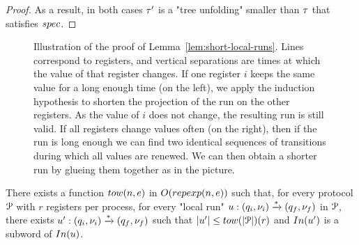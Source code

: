 \begin{proof}
	As a result, in both cases $\tau'$ is a "tree unfolding" smaller than $\tau$ that satisfies $\spec$. 
\end{proof}
\fi

\begin{figure}
	
	\caption{Illustration of the proof of Lemma~\ref{lem:short-local-runs}. Lines correspond to registers, and vertical separations are times at which the value of that register changes. If one register $i$ keeps the same value for a long enough time (on the left), we apply the induction hypothesis to shorten the projection of the run on the other registers. As the value of $i$ does not change, the resulting run is still valid. If all registers change values often (on the right), then if the run is long enough we can find two identical sequences of transitions during which all values are renewed. We can then obtain a shorter run by glueing them together as in the picture.}
\end{figure}




\begin{lemma}
	\label{lem:short-local-runs}
	There exists a function $\towerfun(n, e)$ in $O(\repexp{n}{e})$ such that, for every protocol $\mathcal{P}$ with $r$ registers per process, for every "local run" $u: (q_i, \nu_i) \xrightarrow{*} (q_f, \nu_f)$ in $\mathcal{P}$, there exists $u': (q_i, \nu_i) \xrightarrow{*} (q_f, \nu_f)$ such that $\length{\localrun'} \leq \towerfun(\size{\prot})(r)$ and $\Input{\localrun'}$ is a subword of $\Input{\localrun}$. 
\end{lemma}


